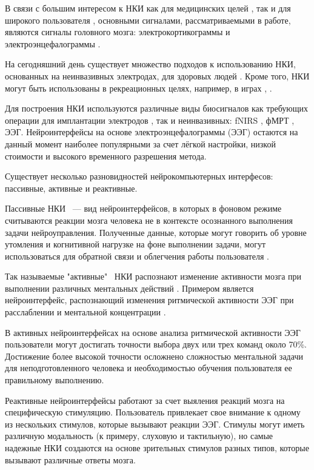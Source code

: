 \documentclass[12pt]{article}
\begin{document}
В связи с большим интересом к НКИ как для медицинских целей \cite{Hu2018,Song2017,Loza2017,Eliseyev2016,Gaglianese2016,Bundy2016,Morishita2014}, так и для широкого пользователя \cite{KaplanShishkin}, основными сигналами, рассматриваемыми в работе, являются сигналы головного мозга: электрокортикограммы \cite{ECOG} и электроэнцефалограммы  \cite{EEG}.

На сегодняшний день существует множество подходов к использованию НКИ, основанных на неинвазивных электродах, для здоровых людей \cite{NER_2015}. Кроме того, НКИ могут быть использованы в рекреационных целях, например, в играх \cite{Recreational_Applications}, \cite{Kaplan_Shishkin_games}.


Для построения НКИ используются различные виды биосигналов как требующих операции для имплантации электродов \cite{collinger2013high}, так и неинвазивных:  fNIRS \cite{nazeer2020enhancing}, фМРТ \cite{yoo2004brain}, ЭЭГ. Нейроинтерфейсы на основе электроэнцефалограммы (ЭЭГ) остаются на данный момент наиболее популярными за счет лёгкой настройки, низкой стоимости и высокого временного разрешения метода. 
    
Существует несколько разновидностей нейрокомпьютерных интерфесов: пассивные, активные и реактивные.

Пассивные НКИ ~--- вид нейроинтерфейсов, в которых в фоновом режиме считываются реакции мозга человека не в контексте осознанного выполнения задачи нейроуправления. Полученные данные, которые могут говорить об уровне утомления и когнитивной нагрузке на фоне выполнении задачи, могут использоваться для обратной связи и облегчения работы пользователя \cite{andreessen2020toward}.


Так называемые "активные" \ НКИ распознают изменение активности мозга при выполнении различных ментальных действий \cite{zander2010enhancing}. Примером является нейроинтерфейс, распознающий изменения ритмической активности ЭЭГ при расслаблении и ментальной концентрации \cite{chen2009model}. 

В активных нейроинтерфейсах на основе анализа ритмической активности ЭЭГ пользователи могут достигать  точности выбора двух или трех команд около 70\%. Достижение более высокой точности осложнено сложностью ментальной задачи для неподготовленного человека и необходимостью обучения пользователя ее правильному выполнению.
    
    
    
Реактивные нейроинтерфейсы работают за счет выяления реакций мозга на специфическую стимуляцию. Пользователь привлекает свое внимание к одному из нескольких стимулов, которые вызывают реакции ЭЭГ. Стимулы могут иметь различную модальность (к примеру, слуховую и тактильную), но самые надежные НКИ создаются на основе зрительных стимулов разных типов, которые вызывают различные ответы мозга.
    
\end{document}

